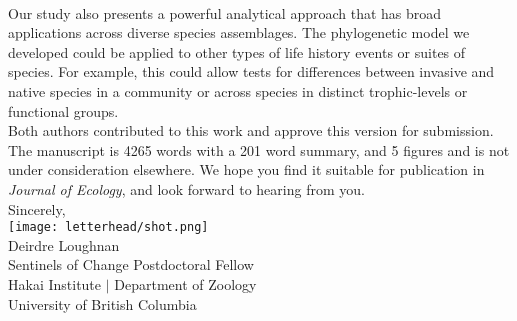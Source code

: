 \documentclass[11pt,a4paper]{article}
\begin{document}
\vspace{1.5ex}\\
Our study also presents a powerful analytical approach that has broad applications across diverse species assemblages. The phylogenetic model we developed could be applied to other types of life history events or suites of species. For example, this could allow tests for differences between invasive and native species in a community or across species in distinct trophic-levels or functional groups.
\vspace{1.5ex}\\
\noindent Both authors contributed to this work and approve this version for submission. The manuscript is 4265 words with a 201 word summary, and 5 figures and is not under consideration elsewhere. We hope you find it suitable for publication in \emph{Journal of Ecology}, and look forward to hearing from you. 
\vspace{1.5ex}\\
\noindent Sincerely, \\
\texttt{[image: letterhead/shot.png]} \\ 
\noindent Deirdre Loughnan\\
\noindent Sentinels of Change Postdoctoral Fellow\\ 
\noindent Hakai Institute $|$ Department of Zoology\\
\noindent University of British Columbia
\newpage
\vspace{-5ex}
% 


\newpage
\end{document}
